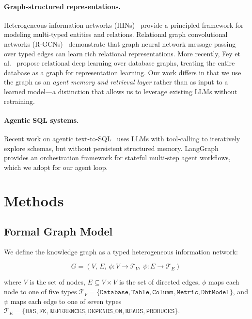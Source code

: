 \documentclass[11pt]{article}
\begin{document}
\paragraph{Graph-structured representations.}
Heterogeneous information networks (HINs)~\cite{sun2013survey} provide a principled framework for modeling multi-typed entities and relations.
Relational graph convolutional networks (R-GCNs)~\cite{schlichtkrull2018rgcn} demonstrate that graph neural network message passing over typed edges can learn rich relational representations.
More recently, Fey et al.~\cite{fey2023relbench} propose relational deep learning over database graphs, treating the entire database as a graph for representation learning.
Our work differs in that we use the graph as an \emph{agent memory and retrieval layer} rather than as input to a learned model---a distinction that allows us to leverage existing LLMs without retraining.

\paragraph{Agentic SQL systems.}
Recent work on agentic text-to-SQL~\cite{yu2024spider2} uses LLMs with tool-calling to iteratively explore schemas, but without persistent structured memory.
LangGraph~\cite{langgraph} provides an orchestration framework for stateful multi-step agent workflows, which we adopt for our agent loop.

\section{Methods}

\subsection{Formal Graph Model}

We define the knowledge graph as a typed heterogeneous information network:

\[
G = (V,\, E,\, \phi : V \to \mathcal{T}_V,\, \psi : E \to \mathcal{T}_E)
\]

where $V$ is the set of nodes, $E \subseteq V \times V$ is the set of directed edges, $\phi$ maps each node to one of five types $\mathcal{T}_V = \{\texttt{Database},\allowbreak\texttt{Table},\allowbreak\texttt{Column},\allowbreak\texttt{Metric},\allowbreak\texttt{DbtModel}\}$, and $\psi$ maps each edge to one of seven types $\mathcal{T}_E = \{\texttt{HAS},\allowbreak\texttt{FK},\allowbreak\texttt{REFERENCES},\allowbreak\texttt{DEPENDS\_ON},\allowbreak\texttt{READS},\allowbreak\texttt{PRODUCES}\}$.
\end{document}
